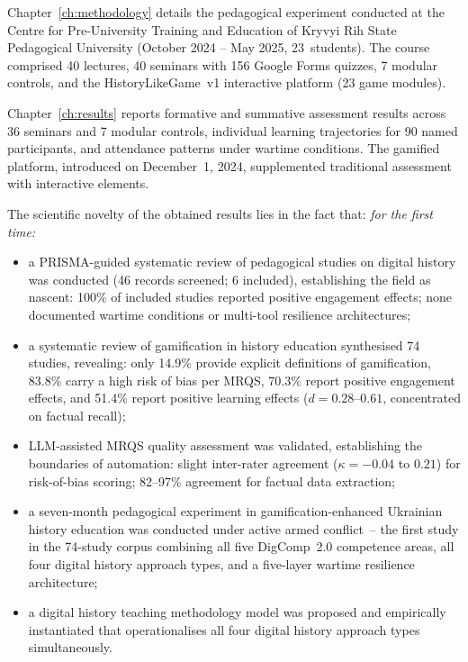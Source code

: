 {{Chapter~\ref{ch:methodology} details the pedagogical experiment conducted at the Centre for Pre-University Training and Education of Kryvyi Rih State Pedagogical University (October 2024 -- May 2025, 23~students). The course comprised 40 lectures, 40 seminars with 156 Google Forms quizzes, 7 modular controls, and the HistoryLikeGame~v1 interactive platform (23 game modules).

Chapter~\ref{ch:results} reports formative and summative assessment results across 36 seminars and 7 modular controls, individual learning trajectories for 90 named participants, and attendance patterns under wartime conditions. The gamified platform, introduced on December~1, 2024, supplemented traditional assessment with interactive elements.

The scientific novelty of the obtained results lies in the fact that:
\textit{for the first time:}
\begin{itemize}
\item a PRISMA-guided systematic review of pedagogical studies on digital
  history was conducted (46 records screened; 6 included), establishing
  the field as nascent: 100\% of included studies reported positive
  engagement effects; none documented wartime conditions or multi-tool
  resilience architectures;
\item a systematic review of gamification in history education synthesised
  74 studies, revealing: only 14.9\% provide explicit definitions of
  gamification, 83.8\% carry a high risk of bias per MRQS, 70.3\% report
  positive engagement effects, and 51.4\% report positive learning effects
  ($d{=}0.28$--$0.61$, concentrated on factual recall);
\item LLM-assisted MRQS quality assessment was validated, establishing the
  boundaries of automation: slight inter-rater agreement
  ($\kappa{=}{-}0.04$ to $0.21$) for risk-of-bias scoring; 82--97\%
  agreement for factual data extraction;
\item a seven-month pedagogical experiment in gamification-enhanced Ukrainian
  history education was conducted under active armed conflict~-- the first
  study in the 74-study corpus combining all five DigComp~2.0 competence
  areas, all four digital history approach types, and a five-layer wartime
  resilience architecture;
\item a digital history teaching methodology model was proposed and
  empirically instantiated that operationalises all four digital history
  approach types simultaneously.
\end{itemize}
}}
